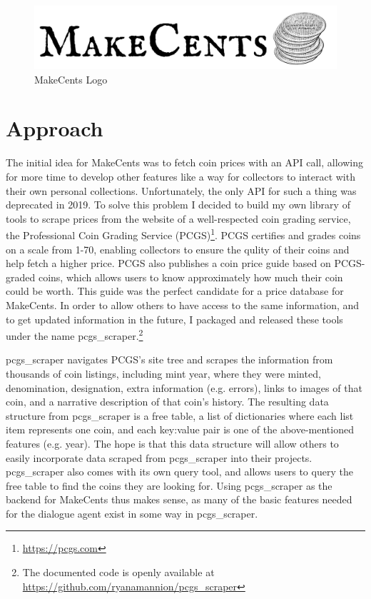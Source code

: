 \documentclass[11pt,a4paper]{article}
\begin{document}

\begin{figure}[t!]
    \centering
    \includegraphics[scale=0.3]{images/MakeCents_logo.png}
    \caption{MakeCents Logo}
    \label{fig:logo}
\end{figure}

\section{Approach}\label{sec:appr}
The initial idea for MakeCents was to fetch coin prices with an API call, allowing for more time to develop other features like a way for collectors to interact with their own personal collections. Unfortunately, the only API for such a thing was deprecated in 2019. To solve this problem I decided to build my own library of tools to scrape prices from the website of a well-respected coin grading service, the Professional Coin Grading Service (PCGS)\footnote{\href{https://pcgs.com}{https://pcgs.com}}. PCGS certifies and grades coins on a scale from 1-70, enabling collectors to ensure the qulity of their coins and help fetch a higher price. PCGS also publishes a coin price guide based on PCGS-graded coins, which allows users to know approximately how much their coin could be worth. This guide was the perfect candidate for a price database for MakeCents. In order to allow others to have access to the same information, and to get updated information in the future, I packaged and released these tools under the name pcgs\_scraper.\footnote{The documented code is openly available at \href{https://github.com/ryanamannion/pcgs_scraper}{https://github.com/ryanamannion/pcgs\_scraper}}

pcgs\_scraper navigates PCGS's site tree and scrapes the information from thousands of coin listings, including mint year, where they were minted, denomination, designation, extra information (e.g. errors), links to images of that coin, and a narrative description of that coin's history. The resulting data structure from pcgs\_scraper is a free table, a list of dictionaries where each list item represents one coin, and each key:value pair is one of the above-mentioned features (e.g. year). The hope is that this data structure will allow others to easily incorporate data scraped from pcgs\_scraper into their projects. pcgs\_scraper also comes with its own query tool, and allows users to query the free table to find the coins they are looking for. Using pcgs\_scraper as the backend for MakeCents thus makes sense, as many of the basic features needed for the dialogue agent exist in some way in pcgs\_scraper. 
\end{document}
